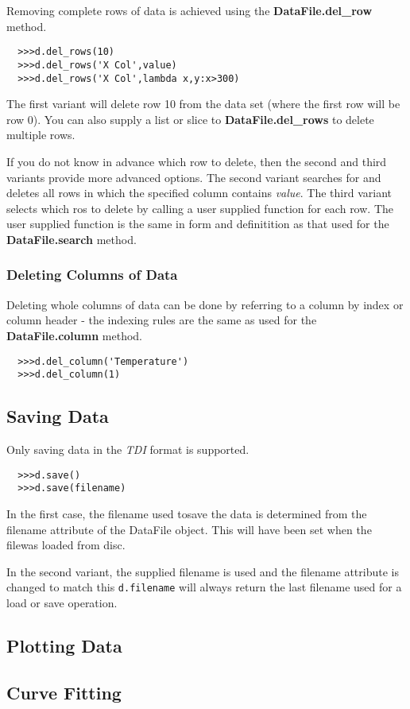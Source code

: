 \documentclass[a4paper,11pt]{scrartcl}
\begin{document}
Removing complete rows of data is achieved using the \textbf{DataFile.del\_row} method.

\begin{verbatim}
  >>>d.del_rows(10)
  >>>d.del_rows('X Col',value)
  >>>d.del_rows('X Col',lambda x,y:x>300)
\end{verbatim}

The first variant will delete row 10 from the data set (where the first row will be row 0). You can also supply a list or slice to \textbf{DataFile.del\_rows} to delete multiple rows.

If you do not know in advance which row to delete, then the second and third variants provide more advanced options. The second variant searches for and deletes all rows in which the specified column contains \textit{value}. The third variant selects which ros to delete by calling a user supplied function for each row. The user supplied function is the same in form and definitition as that used for the \textbf{DataFile.search} method.

\subsubsection{Deleting Columns of Data}

Deleting whole columns of data can be done by referring to a column by index or column header - the indexing rules are the same as used for the \textbf{DataFile.column} method.

\begin{verbatim}
  >>>d.del_column('Temperature')
  >>>d.del_column(1)
\end{verbatim}

\subsection{Saving Data}

Only saving data in the \textit{TDI} format is supported.

\begin{verbatim}
  >>>d.save()
  >>>d.save(filename)
\end{verbatim}

In the first case, the filename used tosave the data is determined from the filename attribute of the DataFile object. This will have been set when the filewas loaded from disc.


In the second variant, the supplied filename is used and the filename attribute is changed to match this \ie \verb#d.filename# will always return the last filename used for a load or save operation.

\subsection{Plotting Data}

\subsection{Curve Fitting}
\end{document}
